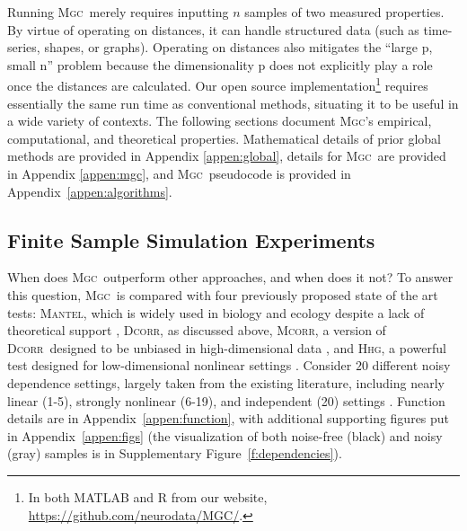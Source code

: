 \documentclass[11pt]{article}
\providecommand{\sct}[1]{{\normalfont\textsc{#1}}}
\newcommand{\Mgc}{\sct{Mgc}}
\newcommand{\Hhg}{\sct{Hhg}}
\newcommand{\Dcorr}{\sct{Dcorr}}
\newcommand{\Mcorr}{\sct{Mcorr}}
\newcommand{\Mantel}{\sct{Mantel}}
\newcommand{\website}{\url{https://github.com/neurodata/MGC/}}
\begin{document}
Running \Mgc~merely requires inputting $n$ samples of two measured properties.  By virtue of operating on distances, it can handle structured data (such as time-series, shapes, or graphs).  Operating on distances also mitigates the ``large p, small n'' problem because the dimensionality p does not explicitly play a role once the distances are calculated.  
Our open source implementation\footnote{In both MATLAB and R from our website, \website.} requires essentially the same run time as conventional methods, situating it to be useful in a wide variety of contexts. 
The following sections document \Mgc's empirical, computational, and theoretical properties. Mathematical details of prior global methods are provided in Appendix \ref{appen:global}, details for \Mgc~are provided in Appendix \ref{appen:mgc}, and \Mgc~pseudocode is provided in Appendix~\ref{appen:algorithms}.



\subsection*{Finite Sample Simulation Experiments}

When does \Mgc~outperform other approaches, and when does it not?
To answer this question, \Mgc~is compared with four previously proposed state of the art tests: \Mantel, which is widely used in biology and ecology despite a lack of theoretical support \cite{Mantel1967}, \Dcorr, as discussed above, \Mcorr, a version of \Dcorr~designed to be unbiased in high-dimensional data \cite{SzekelyRizzo2013a}, and \Hhg, a powerful test designed for low-dimensional nonlinear settings \cite{HellerGorfine2013}. 
Consider $20$ different noisy dependence settings, largely taken from the existing literature, including  nearly linear (1-5), strongly nonlinear (6-19), and independent (20) settings \cite{SzekelyRizzoBakirov2007, SimonTibshirani2012, GorfineHellerHeller2012, HellerGorfine2013, SzekelyRizzo2013a}.  
Function details are in Appendix~\ref{appen:function}, with additional supporting figures put in Appendix~\ref{appen:figs} (the visualization of both noise-free (black) and noisy (gray) samples is in Supplementary Figure~\ref{f:dependencies}).  
\end{document}
